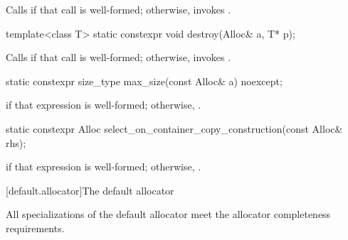 \begin{itemdescr}
\pnum
\effects
Calls 
if that call is well-formed;
otherwise, invokes .
\end{itemdescr}

%
\begin{itemdecl}
template<class T>
  static constexpr void destroy(Alloc& a, T* p);
\end{itemdecl}

\begin{itemdescr}
\pnum
\effects
Calls  if that call is well-formed; otherwise, invokes
.
\end{itemdescr}

%
\begin{itemdecl}
static constexpr size_type max_size(const Alloc& a) noexcept;
\end{itemdecl}

\begin{itemdescr}
\pnum
\returns
{} if that expression is well-formed; otherwise,
.
\end{itemdescr}

%
\begin{itemdecl}
static constexpr Alloc select_on_container_copy_construction(const Alloc& rhs);
\end{itemdecl}

\begin{itemdescr}
\pnum
\returns
{} if that expression is
well-formed; otherwise, .
\end{itemdescr}

[default.allocator]{The default allocator}

\pnum
All specializations of the default allocator meet the
allocator completeness requirements.

